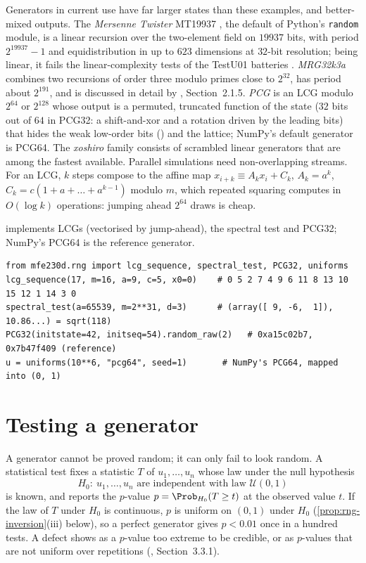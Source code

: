Generators in current use have far larger states than these examples, and better-mixed
outputs. The \emph{Mersenne Twister} MT19937 \citep{matsumoto-nishimura}, the default of
Python's \texttt{random} module, is a linear recursion over the two-element field on $19937$
bits, with period $2^{19937}-1$ and equidistribution in up to $623$ dimensions at $32$-bit
resolution; being linear, it fails the linear-complexity tests of the TestU01 batteries
\citep{lecuyer-simard}. \emph{MRG32k3a} \citep{lecuyer-mrg} combines two recursions of
order three modulo primes close to $2^{32}$, has period about $2^{191}$, and is discussed in
detail by \textcite{glasserman-mc}, Section~2.1.5. \emph{PCG} \citep{oneill-pcg} is an LCG
modulo $2^{64}$ or $2^{128}$ whose output is a permuted, truncated function of the state ($32$
bits out of $64$ in PCG32: a shift-and-xor and a rotation driven by the leading bits) that hides the weak low-order bits
() and the lattice;
NumPy's default generator is PCG64. The \emph{xoshiro} family \citep{blackman-vigna}
consists of scrambled linear generators that are among the fastest available.
Parallel simulations need non-overlapping streams. For an LCG, $k$ steps compose to the
affine map $x_{i+k}\equiv A_kx_i+C_k$, $A_k=a^k$, $C_k=c(1+a+\dots+a^{k-1})$ modulo $m$, which
repeated squaring computes in $O(\log k)$ operations: jumping ahead $2^{64}$ draws is cheap.

\begin{incode}
 implements LCGs (vectorised by jump-ahead), the
spectral test and PCG32; NumPy's PCG64 is the reference generator.
\begin{lstlisting}
from mfe230d.rng import lcg_sequence, spectral_test, PCG32, uniforms
lcg_sequence(17, m=16, a=9, c=5, x0=0)    # 0 5 2 7 4 9 6 11 8 13 10 15 12 1 14 3 0
spectral_test(a=65539, m=2**31, d=3)      # (array([ 9, -6,  1]), 10.86...) = sqrt(118)
PCG32(initstate=42, initseq=54).random_raw(2)   # 0xa15c02b7, 0x7b47f409 (reference)
u = uniforms(10**6, "pcg64", seed=1)       # NumPy's PCG64, mapped into (0, 1)
\end{lstlisting}
\end{incode}

\section{Testing a generator}\label{sec:rng-testing}

A generator cannot be proved random; it can only fail to look random. A statistical test
fixes a statistic $T$ of $u_1,\dots,u_n$ whose law under the null hypothesis
\[
  H_0:\ u_1,\dots,u_n \text{ are independent with law } \mathcal U(0,1)
\]
is known, and reports the $p$-value $p=\Prob_{H_0}(T\ge t)$ at the observed value $t$. If
the law of $T$ under $H_0$ is continuous, $p$ is uniform on $(0,1)$ under $H_0$
(\cref{prop:rng-inversion}(iii) below), so a perfect generator gives $p<0.01$ once in a
hundred tests. A defect shows as a $p$-value too extreme to be credible, or as $p$-values that
are not uniform over repetitions (\textcite{knuth-taocp2}, Section~3.3.1).

